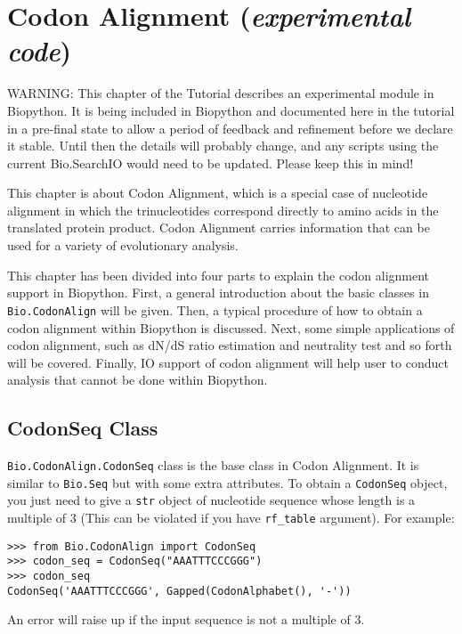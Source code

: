 \chapter{Codon Alignment (\textit{experimental code})}
\label{chap:codonalignment}

WARNING: This chapter of the Tutorial describes an experimental module in
Biopython. It is being included in Biopython and documented here in the
tutorial in a pre-final state to allow a period of feedback and refinement
before we declare it stable. Until then the details will probably change,
and any scripts using the current Bio.SearchIO would need to be updated.
Please keep this in mind!

This chapter is about Codon Alignment, which is a special case of
nucleotide alignment in which the trinucleotides correspond directly to
amino acids in the translated protein product. Codon Alignment carries
information that can be used for a variety of evolutionary analysis.

This chapter has been divided into four parts to explain the codon
alignment support in Biopython. First, a general introduction about the
basic classes in \verb|Bio.CodonAlign| will be given. Then, a typical
procedure of how to obtain a codon alignment within Biopython is
discussed. Next, some simple applications of codon alignment, such as
dN/dS ratio estimation and neutrality test and so forth will be covered.
Finally, IO support of codon alignment will help user to conduct
analysis that cannot be done within Biopython.

\section{CodonSeq Class}

\verb|Bio.CodonAlign.CodonSeq| class is the base class in Codon
Alignment. It is similar to \verb|Bio.Seq| but with some extra
attributes. To obtain a \verb|CodonSeq| object, you just need
to give a \verb|str| object of nucleotide sequence whose length is a
multiple of 3 (This can be violated if you have \texttt{rf\_table}
argument). For example:

\begin{verbatim}
>>> from Bio.CodonAlign import CodonSeq
>>> codon_seq = CodonSeq("AAATTTCCCGGG")
>>> codon_seq
CodonSeq('AAATTTCCCGGG', Gapped(CodonAlphabet(), '-'))
\end{verbatim}

An error will raise up if the input sequence is not a multiple of 3.


